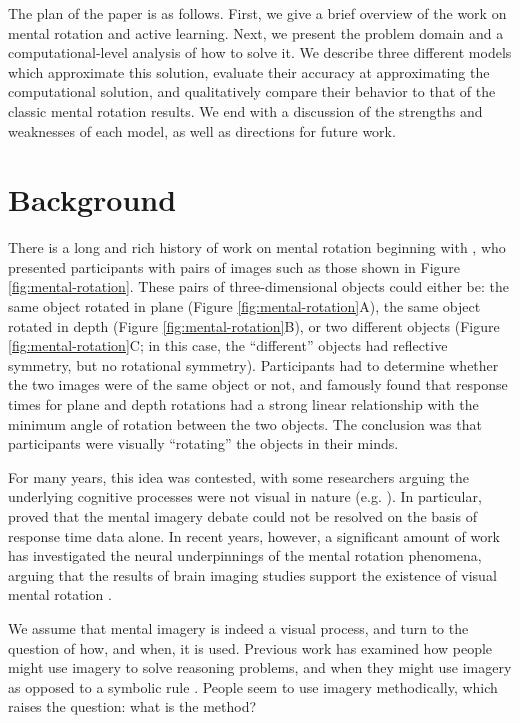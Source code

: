 \documentclass{article} %
\begin{document}
The plan of the paper is as follows. First, we give a brief overview
of the work on mental rotation and active learning. Next, we present
the problem domain and a computational-level analysis of how to solve
it. We describe three different models which approximate this
solution, evaluate their accuracy at approximating the computational
solution, and qualitatively compare their behavior to that of the
classic mental rotation results. We end with a discussion of the
strengths and weaknesses of each model, as well as directions for
future work.

\section{Background}

There is a long and rich history of work on mental rotation beginning
with \cite{Shepard1971}, who presented participants with pairs of
images such as those shown in Figure \ref{fig:mental-rotation}. These
pairs of three-dimensional objects could either be: the same object
rotated in plane (Figure \ref{fig:mental-rotation}A), the same object
rotated in depth (Figure \ref{fig:mental-rotation}B), or two different
objects (Figure \ref{fig:mental-rotation}C; in this case, the
``different'' objects had reflective symmetry, but no rotational
symmetry). Participants had to determine whether the two images were
of the same object or not, and \cite{Shepard1971} famously found that
response times for plane and depth rotations had a strong linear
relationship with the minimum angle of rotation between the two
objects. The conclusion was that participants were visually
``rotating'' the objects in their minds.

For many years, this idea was contested, with some researchers arguing
the underlying cognitive processes were not visual in nature
(e.g. \cite{Pylyshyn1981}). In particular, \cite{Anderson1978} proved
that the mental imagery debate could not be resolved on the basis of
response time data alone. In recent years, however, a significant
amount of work has investigated the neural underpinnings of the mental
rotation phenomena, arguing that the results of brain imaging studies
support the existence of visual mental rotation \cite{Kosslyn1988,
  Kosslyn:2009tj}.

We assume that mental imagery is indeed a visual process, and turn to
the question of how, and when, it is used. Previous work has examined
how people might use imagery \cite{Hegarty2004, Schwartz1999} to solve
reasoning problems, and when they might use imagery as opposed to a
symbolic rule \cite{Schwartz:1996uy}. People seem to use imagery
methodically, which raises the question: what is the method?
\end{document}
